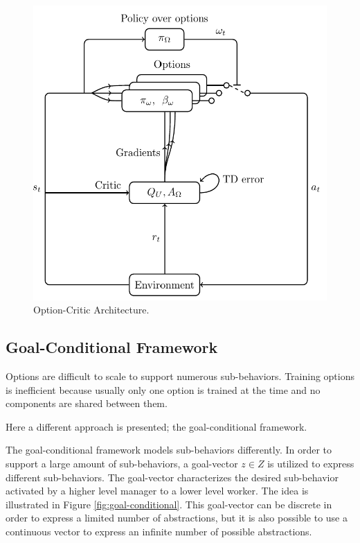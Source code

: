 \begin{figure}[H]
    \centering
    \label{fig:options_critic}
    \caption{Option-Critic Architecture.}
    \includegraphics[scale=0.2]{Images/option-critic.png}
\end{figure}

\subsection{Goal-Conditional Framework}

Options are difficult to scale to support numerous sub-behaviors. Training options is inefficient because usually only
one option is trained at the time and no components are shared between them.

Here a different approach is presented; the goal-conditional framework.

The goal-conditional framework models sub-behaviors differently. In order to support a large amount of sub-behaviors,
a goal-vector $z \in Z$ is utilized to express different sub-behaviors.
The goal-vector characterizes the desired sub-behavior activated by a higher level manager to a lower level worker.
The idea is illustrated in Figure \ref{fig:goal-conditional}. This goal-vector can be discrete in order to express
a limited number of abstractions, but it is also possible to use a continuous vector to express an infinite number of possible abstractions.


